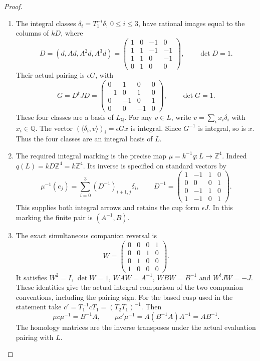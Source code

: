 \begin{proof}
\begin{enumerate}[label=\arabic*.]
\item The integral classes
$\delta_i=T_1^{-i}\delta$, $0\leq i\leq3$, have rational images
equal to the columns of $kD$, where
\[
 D=(d,Ad,A^2d,A^3d)=
 \begin{pmatrix}1&0&-1&0\\1&1&-1&-1\\1&1&0&-1\\0&1&0&0\end{pmatrix},
 \qquad \det D=1.
\]
Their actual pairing is $\epsilon G$, with
\[
 G=D^tJD=
 \begin{pmatrix}0&1&0&0\\-1&0&1&0\\0&-1&0&1\\0&0&-1&0\end{pmatrix},
 \qquad \det G=1.
\]
These four classes are a basis of $L_{\mathbb Q}$. For any $v\in L$,
write $v=\sum_i x_i\delta_i$ with $x_i\in\mathbb Q$.
The vector $(\langle\delta_i,v\rangle)_i=\epsilon Gx$ is integral.
Since $G^{-1}$ is integral, so is $x$. Thus the four classes are an
integral basis of $L$.

\item The required integral marking is the precise map
$\mu=k^{-1}q:L\longrightarrow\mathbb Z^4$.
Indeed $q(L)=kD\mathbb Z^4=k\mathbb Z^4$. Its inverse is specified
on standard vectors by
\[
 \mu^{-1}(e_j)=\sum_{i=0}^3(D^{-1})_{i+1,j}\delta_i,
 \qquad
 D^{-1}=\begin{pmatrix}1&-1&1&0\\0&0&0&1\\0&-1&1&0\\1&-1&0&1\end{pmatrix}.
\]
This supplies both integral arrows and retains the cup form
$\epsilon J$. In this marking the finite pair is $(A^{-1},B)$.

\item The exact simultaneous companion reversal is
\[
 W=\begin{pmatrix}0&0&0&1\\0&0&1&0\\0&1&0&0\\1&0&0&0\end{pmatrix}.
\]
It satisfies $W^2=I$, $\det W=1$, $WAW=A^{-1}$,
$WBW=B^{-1}$ and $W^tJW=-J$. These identities give the actual
integral comparison of the two companion conventions, including
the pairing sign. For the based cusp used in the statement take
$c'=T_1^{-1}cT_1=(T_2T_1)^{-1}$. Then
\[
 \mu c\mu^{-1}=B^{-1}A,\qquad
 \mu c'\mu^{-1}=A(B^{-1}A)A^{-1}=AB^{-1}.
\]
The homology matrices are the inverse transposes under the actual
evaluation pairing with $L$.


\end{enumerate}
\end{proof}
